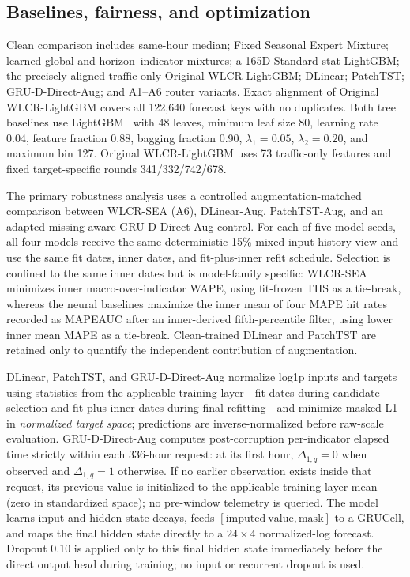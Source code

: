 \documentclass[10pt,conference,letterpaper]{IEEEtran}
\newcommand{\method}{WLCR-SEA}
\newcommand{\originalmethod}{Original WLCR-LightGBM}
\newcommand{\fixedmixture}{Fixed Seasonal Expert Mixture}
\begin{document}
\subsection{Baselines, fairness, and optimization}
Clean comparison includes same-hour median; \fixedmixture{}; learned global and horizon--indicator mixtures; a 165D Standard-stat LightGBM; the precisely aligned traffic-only \originalmethod{}; DLinear; PatchTST; GRU-D-Direct-Aug; and A1--A6 router variants. Exact alignment of \originalmethod{} covers all 122,640 forecast keys with no duplicates. Both tree baselines use LightGBM~\cite{ke2017lightgbm} with 48 leaves, minimum leaf size 80, learning rate 0.04, feature fraction 0.88, bagging fraction 0.90, $\lambda_1=0.05$, $\lambda_2=0.20$, and maximum bin 127. \originalmethod{} uses 73 traffic-only features and fixed target-specific rounds 341/332/742/678.

The primary robustness analysis uses a controlled augmentation-matched comparison between \method{} (A6), DLinear-Aug, PatchTST-Aug, and an adapted missing-aware GRU-D-Direct-Aug control. For each of five model seeds, all four models receive the same deterministic 15\% mixed input-history view and use the same fit dates, inner dates, and fit-plus-inner refit schedule. Selection is confined to the same inner dates but is model-family specific: WLCR-SEA minimizes inner macro-over-indicator WAPE, using fit-frozen THS as a tie-break, whereas the neural baselines maximize the inner mean of four MAPE hit rates recorded as MAPEAUC after an inner-derived fifth-percentile filter, using lower inner mean MAPE as a tie-break. Clean-trained DLinear and PatchTST are retained only to quantify the independent contribution of augmentation.

DLinear, PatchTST, and GRU-D-Direct-Aug normalize log1p inputs and targets using statistics from the applicable training layer---fit dates during candidate selection and fit-plus-inner dates during final refitting---and minimize masked L1 in \emph{normalized target space}; predictions are inverse-normalized before raw-scale evaluation. GRU-D-Direct-Aug computes post-corruption per-indicator elapsed time strictly within each 336-hour request: at its first hour, $\Delta_{1,q}=0$ when observed and $\Delta_{1,q}=1$ otherwise. If no earlier observation exists inside that request, its previous value is initialized to the applicable training-layer mean (zero in standardized space); no pre-window telemetry is queried. The model learns input and hidden-state decays, feeds $[\mathrm{imputed\ value},\mathrm{mask}]$ to a GRUCell, and maps the final hidden state directly to a $24\times4$ normalized-log forecast. Dropout 0.10 is applied only to this final hidden state immediately before the direct output head during training; no input or recurrent dropout is used.
\end{document}

